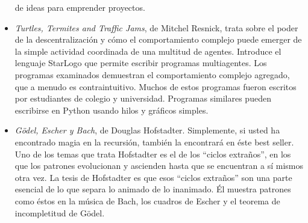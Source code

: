 \begin{itemize}
de ideas para emprender proyectos.
\item {\em Turtles, Termites and Traffic Jams}, de Mitchel Resnick, trata
sobre el poder de la descentralización y cómo el comportamiento complejo
puede emerger de la simple actividad coordinada de una multitud de
agentes. Introduce el lenguaje StarLogo que permite escribir programas
multiagentes. Los programas examinados demuestran el comportamiento
complejo agregado, que a menudo es contraintuitivo. Muchos de estos
programas fueron escritos por estudiantes de colegio y universidad.
Programas similares pueden escribirse en Python usando hilos y gráficos
simples.
\item {\em Gödel, Escher y Bach}, de Douglas Hofstadter. Simplemente,
si usted ha encontrado magia en la recursión, también la encontrará
en éste best seller. Uno de los temas que trata Hofstadter es el de
los ``ciclos extraños'', en los que los patrones evolucionan y ascienden
hasta que se encuentran a sí mismos otra vez. La tesis de Hofstadter
es que esos ``ciclos extraños'' son una parte esencial de lo que
separa lo animado de lo inanimado. Él muestra patrones como éstos
en la música de Bach, los cuadros de Escher y el teorema de incompletitud
de Gödel.
\end{itemize}

